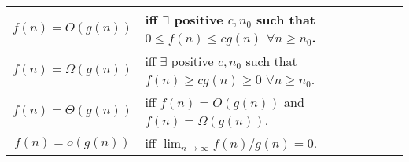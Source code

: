 \begin{tabu} to \linewidth {c|X[c,m]}
  $f(n) = O(g(n))$ & iff $\exists$ positive $c, n_0$ such that $0 \leq f(n) \leq
  cg(n)$ $\forall n \geq n_0$. \\ \hline
  $f(n) = \Omega(g(n))$ & iff $\exists$ positive $c, n_0$ such that $f(n) \geq
  cg(n) \geq 0$ $\forall n \geq n_0$. \\ \hline
  $f(n) = \Theta(g(n))$ & iff $f(n) = O(g(n))$ and $f(n) = \Omega(g(n))$.
  \\ \hline
  $f(n) = o(g(n))$ & iff $\lim_{n \to \infty} f(n)/g(n) = 0$. \\ \hline
\end{tabu}
